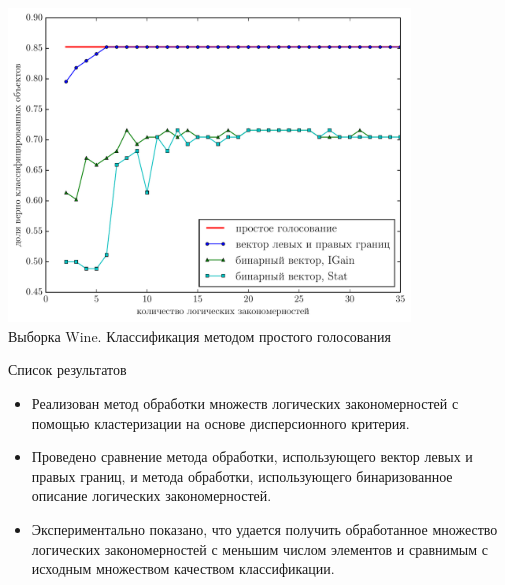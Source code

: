 \documentclass[utf8]{beamer}
\begin{document}
\begin{frame}
  \centering
  \includegraphics[width=0.8\textwidth,keepaspectratio]{wine}
  \\ Выборка Wine. Классификация методом простого голосования
\end{frame}

\begin{frame}{Список результатов}
  \begin{itemize}
    \item Реализован метод обработки множеств логических
      закономерностей с помощью кластеризации на основе дисперсионного
      критерия.
    \item Проведено сравнение метода обработки, использующего вектор
      левых и правых границ, и метода обработки, использующего
      бинаризованное описание логических закономерностей.
    \item Экспериментально показано, что удается получить обработанное
      множество логических закономерностей с меньшим числом элементов
      и сравнимым с исходным множеством качеством классификации.
  \end{itemize}
\end{frame}
\end{document}
